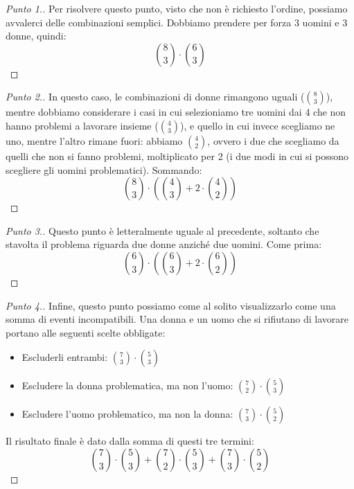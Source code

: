 \documentclass[12pt]{article}
\renewcommand\qedsymbol{$\square$}
\begin{document}
\renewcommand\qedsymbol{$\square$}

\begin{proof}[Punto 1.]
	Per risolvere questo punto, visto che non è richiesto l'ordine, possiamo  avvalerci delle combinazioni semplici. Dobbiamo prendere per forza 3 uomini e 3 donne, quindi:
	\[
		\binom{8}{3} \cdot \binom{6}{3}
    \]
\end{proof}

\begin{proof}[Punto 2.]
	In questo caso, le combinazioni di donne rimangono uguali ($\binom{8}{3}$), mentre dobbiamo considerare i casi in cui selezioniamo tre uomini dai 4 che non hanno problemi a lavorare insieme ($\binom{4}{3}$), e quello in cui invece scegliamo ne uno, mentre l'altro rimane fuori: abbiamo $\binom{4}{2}$, ovvero i due che scegliamo da quelli che non si fanno problemi, moltiplicato per 2 (i due modi in cui si possono scegliere gli uomini problematici). Sommando:
	\[
		\binom{8}{3} \cdot \left( \binom{4}{3} + 2 \cdot \binom{4}{2} \right)
    \]
\end{proof}

\begin{proof}[Punto 3.]
	Questo punto è letteralmente uguale al precedente, soltanto che stavolta il problema riguarda due donne anziché due uomini. Come prima:
	\[
		\binom{6}{3} \cdot \left( \binom{6}{3} + 2 \cdot \binom{6}{2} \right)
    \]
\end{proof}
\renewcommand\qedsymbol{$\blacksquare$}

\begin{proof}[Punto 4.]
	Infine, questo punto possiamo come al solito visualizzarlo come una somma di eventi incompatibili. Una donna e un uomo che si rifiutano di lavorare portano alle seguenti scelte obbligate:
	
	\begin{itemize}
		\item Escluderli entrambi: $\binom{7}{3} \cdot \binom{5}{3}$
		\item Escludere la donna problematica, ma non l'uomo: $\binom{7}{2} \cdot \binom{5}{3}$
		\item Escludere l'uomo problematico, ma non la donna: $\binom{7}{3} \cdot \binom{5}{2}$
	\end{itemize}
	
	Il risultato finale è dato dalla somma di questi tre termini:
	\[
		\binom{7}{3} \cdot \binom{5}{3} + \binom{7}{2} \cdot \binom{5}{3} + \binom{7}{3} \cdot \binom{5}{2}
    \]
\end{proof}
\end{document}
